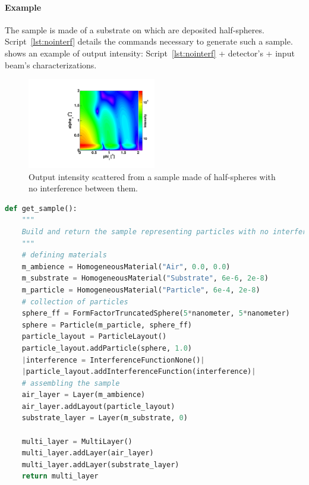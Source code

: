 \paragraph{Example} The sample is made of a substrate on which are deposited half-spheres. Script~\ref{lst:nointerf} details the commands necessary to generate such a sample.  shows an example of output intensity: Script~\ref{lst:nointerf}  + detector's + input beam's characterizations.


\begin{figure}[tb]
\begin{center}
\includegraphics[angle=-90,width=0.5\textwidth]{fig/gisasmap/HSphere_NoInterf.pdf}
\end{center}
\caption{Output intensity scattered from a sample made of half-spheres with no interference between them.}
\label{fig:nointerf}
\end{figure}

\FloatBarrier
\newpage

\begin{lstlisting}[language=python, style=eclipseboxed,numbers=none,nolol,caption={\Code{Python} script to simulate a sample made of half-spheres deposited on a substrate layer without any interference. The part specific to the interferences is marked in a red italic font.},label={lst:nointerf}]
def get_sample():
    """
    Build and return the sample representing particles with no interference
    """
    # defining materials
    m_ambience = HomogeneousMaterial("Air", 0.0, 0.0)
    m_substrate = HomogeneousMaterial("Substrate", 6e-6, 2e-8)
    m_particle = HomogeneousMaterial("Particle", 6e-4, 2e-8)
    # collection of particles
    sphere_ff = FormFactorTruncatedSphere(5*nanometer, 5*nanometer)
    sphere = Particle(m_particle, sphere_ff)
    particle_layout = ParticleLayout()
    particle_layout.addParticle(sphere, 1.0)
    |interference = InterferenceFunctionNone()|
    |particle_layout.addInterferenceFunction(interference)|
    # assembling the sample
    air_layer = Layer(m_ambience)
    air_layer.addLayout(particle_layout)
    substrate_layer = Layer(m_substrate, 0)

    multi_layer = MultiLayer()
    multi_layer.addLayer(air_layer)
    multi_layer.addLayer(substrate_layer)
    return multi_layer
\end{lstlisting}

